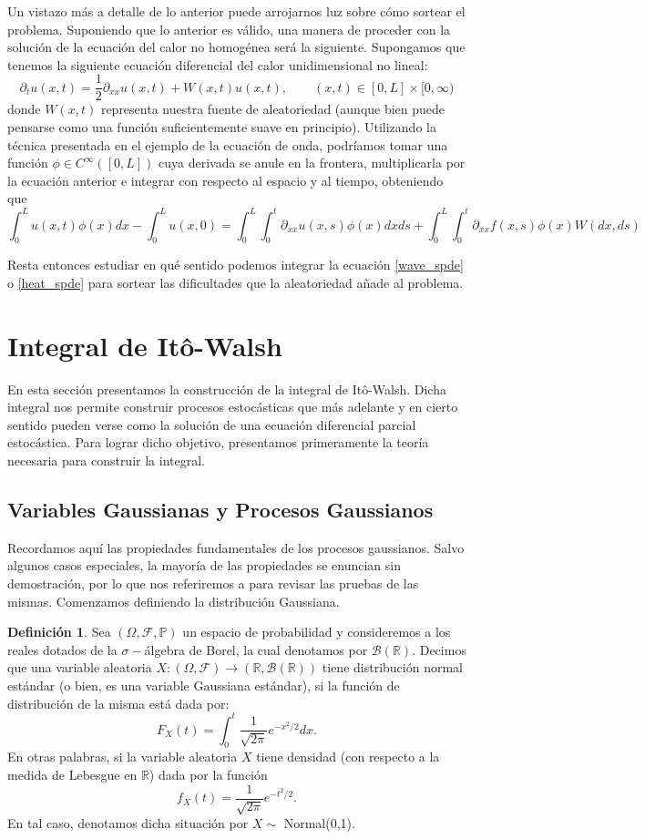 \documentclass[letterpaper,twoside,12pt]{book}
\newcommand{\R}{\mathbb{R}}
\newcommand{\F}{\mathcal{F}}
\newcommand{\B}{\mathcal{B}}
\renewcommand{\P}{\mathbb{P}}
\newcommand{\1}{\mathds{1}}
\renewcommand{\to}{\rightarrow}
\theoremstyle{definition}
\newtheorem{dfn}{Definición}
\theoremstyle{definition}
\theoremstyle{definition}
\theoremstyle{definition}
\theoremstyle{definition}
\theoremstyle{definition}
\theoremstyle{definition}
\begin{document}
Un vistazo más a detalle de lo anterior puede arrojarnos luz sobre cómo sortear el problema. Suponiendo que lo anterior es válido, una manera de proceder con la solución de la ecuación del calor no homogénea será la siguiente. Supongamos que tenemos la siguiente ecuación diferencial del calor unidimensional no lineal:
\[
\partial_tu(x,t)=\frac{1}{2}\partial_{xx}u(x,t)+W(x,t)u(x,t), \qquad (x,t)\in [0,L]\times [0,\infty) 
\]
donde $W(x,t)$ representa nuestra fuente de aleatoriedad (aunque bien puede pensarse como una función suficientemente suave en principio). Utilizando la técnica presentada en el ejemplo de la ecuación de onda, podríamos tomar una función $\phi \in C^{\infty}([0,L])$ cuya derivada se anule en la frontera, multiplicarla por la ecuación anterior e integrar con respecto al espacio y al tiempo, obteniendo que 
\[
\int_{0}^{L}u(x,t)\phi(x)dx-\int_{0}^{L}u(x,0)=\int_{0}^{L}\int_{0}^{t}\partial_{xx}u(x,s)\phi(x)dx ds+\int_{0}^{L}\int_{0}^{t}\partial_{xx}f(x,s)\phi(x)W(dx,ds)
\]
 
Resta entonces estudiar en qué sentido podemos integrar la ecuación \eqref{wave_spde} o \eqref{heat_spde} para sortear las dificultades que la aleatoriedad añade al problema.

\section{Integral de Itô-Walsh}
En esta sección presentamos la construcción de la integral de Itô-Walsh. Dicha integral nos permite construir procesos estocásticas que más adelante y en cierto sentido pueden verse como la solución de una ecuación diferencial parcial estocástica. Para lograr dicho objetivo, presentamos primeramente la teoría necesaria para construir la integral.
\subsection{Variables Gaussianas y Procesos Gaussianos}
Recordamos aquí las propiedades fundamentales de los procesos gaussianos. Salvo algunos casos especiales, la mayoría de las propiedades se enuncian sin demostración, por lo que nos referiremos a \cite{LeGall2016} para revisar las pruebas de las mismas. Comenzamos definiendo la distribución Gaussiana.

\begin{dfn}
Sea $(\Omega, \F, \P)$ un espacio de probabilidad y consideremos a los reales dotados de la $\sigma-$álgebra de Borel, la cual denotamos por $\B(\R)$. Decimos que una variable aleatoria $X:(\Omega, \F)\to (\R,\B(\R))$ tiene distribución normal estándar (o bien, es una variable Gaussiana estándar), si la función de distribución de la misma está dada por: 
\[
F_X(t)=\int_{0}^{t}\frac{1}{\sqrt{2\pi}}e^{-x^2/2}dx.    
\]
En otras palabras, si la variable aleatoria $X$ tiene densidad (con respecto a la medida de Lebesgue en $\R$) dada por la función 
\[
f_X(t)=\frac{1}{\sqrt{2\pi}}e^{-t^2/2}.
\]
En tal caso, denotamos dicha situación por $X\sim$ Normal(0,1).
\end{dfn}
\end{document}

